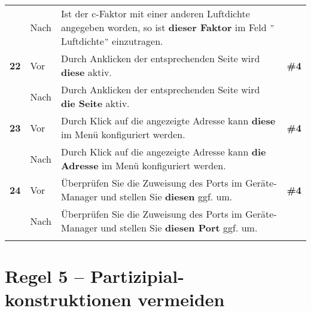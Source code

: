\begin{longtable}{llp{}l}
& Nach & Ist der c-Faktor mit einer anderen Luftdichte angegeben worden, so ist \textbf{dieser Faktor} im Feld $"$Luftdichte$"$ einzutragen. & \\
\tablevspace
{ \textbf{22}} & Vor & Durch Anklicken der entsprechenden Seite wird \textbf{diese} aktiv. & \textbf{\#4}\\
& Nach & Durch Anklicken der entsprechenden Seite wird \textbf{die Seite} aktiv. & \\
\tablevspace
{ \textbf{23}} & Vor & Durch Klick auf die angezeigte Adresse kann \textbf{diese} im Menü konfiguriert werden. & \textbf{\#4}\\
& Nach & Durch Klick auf die angezeigte Adresse kann \textbf{die Adresse} im Menü konfiguriert werden. & \\
\tablevspace
{ \textbf{24}} & Vor & Überprüfen Sie die Zuweisung des Ports im Geräte-Manager und stellen Sie \textbf{diesen} ggf. um. & \textbf{\#4}\\
& Nach & Überprüfen Sie die Zuweisung des Ports im Geräte-Manager und stellen Sie \textbf{diesen Port} ggf. um. & \\
\lspbottomrule
\end{longtable}


\section*{Regel 5 -- Partizipial-konstruktionen vermeiden}


